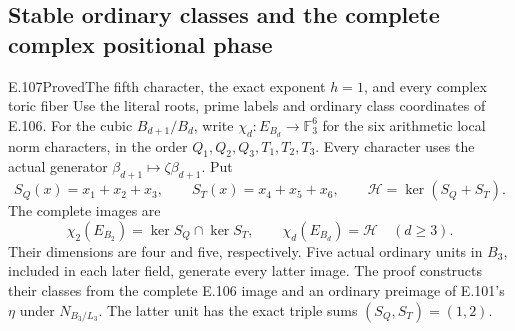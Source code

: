 \subsection{Stable ordinary classes and the complete complex positional phase}

\begin{statement}{E.107}{Proved}{The fifth character, the exact exponent \(h=1\), and every complex toric fiber}
Use the literal roots, prime labels and ordinary class coordinates of
E.106. For the cubic \(B_{d+1}/B_d\), write
\(\chi_d:E_{B_d}\to\mathbb F_3^6\) for the six arithmetic local
norm characters, in the order \(Q_1,Q_2,Q_3,T_1,T_2,T_3\).
Every character uses the actual generator
\(\beta_{d+1}\mapsto\zeta\beta_{d+1}\). Put
\[
 S_Q(x)=x_1+x_2+x_3,\qquad S_T(x)=x_4+x_5+x_6,\qquad
 \mathcal H=\ker(S_Q+S_T).
 \tag{E107.1}
\]
The complete images are
\[
 \chi_2(E_{B_2})=\ker S_Q\cap\ker S_T,\qquad
 \chi_d(E_{B_d})=\mathcal H\quad(d\ge3).
 \tag{E107.2}
\]
Their dimensions are four and five, respectively. Five actual ordinary
units in \(B_3\), included in each later field, generate every latter
image. The proof constructs their classes from the complete E.106
image and an ordinary preimage of E.101's \(\eta\) under
\(N_{B_3/L_3}\). The latter unit has the exact triple sums
\((S_Q,S_T)=(1,2)\).


\end{statement}
